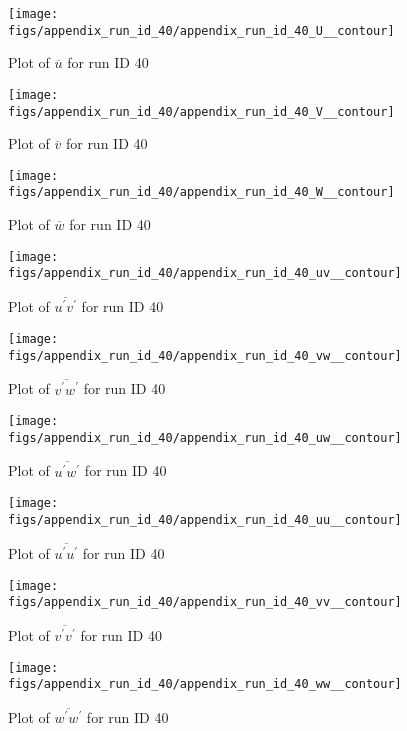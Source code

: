 \begin{figure}[H]
\centering
\texttt{[image: figs/appendix\_run\_id\_40/appendix\_run\_id\_40\_U\_\_contour]}
\caption{Plot of $\overline{u}$ for run ID 40}
\label{fig:appendix_run_id_40_U__contour}
\end{figure}


\begin{figure}[H]
\centering
\texttt{[image: figs/appendix\_run\_id\_40/appendix\_run\_id\_40\_V\_\_contour]}
\caption{Plot of $\overline{v}$ for run ID 40}
\label{fig:appendix_run_id_40_V__contour}
\end{figure}


\begin{figure}[H]
\centering
\texttt{[image: figs/appendix\_run\_id\_40/appendix\_run\_id\_40\_W\_\_contour]}
\caption{Plot of $\overline{w}$ for run ID 40}
\label{fig:appendix_run_id_40_W__contour}
\end{figure}


\begin{figure}[H]
\centering
\texttt{[image: figs/appendix\_run\_id\_40/appendix\_run\_id\_40\_uv\_\_contour]}
\caption{Plot of $\overline{u^\prime v^\prime}$ for run ID 40}
\label{fig:appendix_run_id_40_uv__contour}
\end{figure}


\begin{figure}[H]
\centering
\texttt{[image: figs/appendix\_run\_id\_40/appendix\_run\_id\_40\_vw\_\_contour]}
\caption{Plot of $\overline{v^\prime w^\prime}$ for run ID 40}
\label{fig:appendix_run_id_40_vw__contour}
\end{figure}


\begin{figure}[H]
\centering
\texttt{[image: figs/appendix\_run\_id\_40/appendix\_run\_id\_40\_uw\_\_contour]}
\caption{Plot of $\overline{u^\prime w^\prime}$ for run ID 40}
\label{fig:appendix_run_id_40_uw__contour}
\end{figure}


\begin{figure}[H]
\centering
\texttt{[image: figs/appendix\_run\_id\_40/appendix\_run\_id\_40\_uu\_\_contour]}
\caption{Plot of $\overline{u^\prime u^\prime}$ for run ID 40}
\label{fig:appendix_run_id_40_uu__contour}
\end{figure}


\begin{figure}[H]
\centering
\texttt{[image: figs/appendix\_run\_id\_40/appendix\_run\_id\_40\_vv\_\_contour]}
\caption{Plot of $\overline{v^\prime v^\prime}$ for run ID 40}
\label{fig:appendix_run_id_40_vv__contour}
\end{figure}


\begin{figure}[H]
\centering
\texttt{[image: figs/appendix\_run\_id\_40/appendix\_run\_id\_40\_ww\_\_contour]}
\caption{Plot of $\overline{w^\prime w^\prime}$ for run ID 40}
\label{fig:appendix_run_id_40_ww__contour}
\end{figure}


